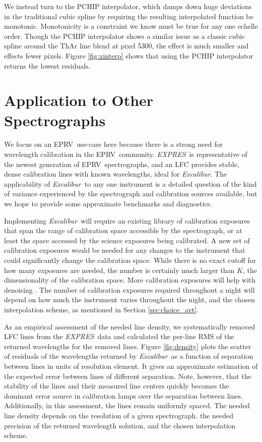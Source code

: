 \documentclass[modern]{aastex63}
\newcommand{\project}[1]{\textsl{#1}}
\newcommand{\name}{\project{Excalibur}}
\newcommand{\acronym}[1]{{\small{#1}}}
\newcommand{\expres}{\project{\acronym{EXPRES}}}
\newcommand{\eprv}{\acronym{EPRV}}
\begin{document}
We instead turn to the PCHIP interpolator, which damps down huge deviations in the traditional cubic spline by requiring the resulting interpolated function be monotonic.  Monotonicity is a constraint we know must be true for any one echelle order.  Though the PCHIP interpolator shows a similar issue as a classic cubic spline around the ThAr line blend at pixel 5300, the effect is much smaller and effects fewer pixels.  Figure \ref{fig:xinterp} shows that using the PCHIP interpolator returns the lowest residuals.  


\section{Application to Other Spectrographs}
\label{sec:others}
We focus on an \eprv\ use-case here because there is a strong need for wavelength calibration in the \eprv\ community.  \expres\ is representative of the newest generation of \eprv\ spectrographs, and an LFC provides stable, dense calibration lines with known wavelengths, ideal for \name.  The applicability of \name\ to any one instrument is a detailed question of the kind of variance experienced by the spectrograph and calibration sources available, but we hope to provide some approximate benchmarks and diagnostics.

Implementing \name\ will require an existing library of calibration exposures that span the range of calibration space accessible by the spectrograph, or at least the space accessed by the science exposures being calibrated.  A new set of calibration exposures would be needed for any changes to the instrument that could significantly change the calibration space.  While there is no exact cutoff for how many exposures are needed, the number is certainly much larger than $K$, the dimensionality of the calibration space.  More calibration exposures will help with denoising .  The number of calibration exposures required throughout a night will depend on how much the instrument varies throughout the night, and the chosen interpolation scheme, as mentioned in Section \ref{sec:choice_avt}.

As an empirical assessment of the needed line density, we systematically removed LFC lines from the \expres\ data and calculated the per-line RMS of the returned wavelengths for the removed lines.  Figure \ref{fig:density} plots the scatter of residuals of the wavelengths returned by \name\ as a function of separation between lines in units of resolution element.  It gives an approximate estimation of the expected error between lines of different separation.  Note, however, that the stability of the lines and their measured line centers quickly becomes the dominant error source in calibration lamps over the separation between lines.  Additionally, in this assessment, the lines remain uniformly spaced.  The needed line density depends on the resolution of a given spectrograph. the needed precision of the returned wavelength solution, and the chosen interpolation scheme.
\end{document}
